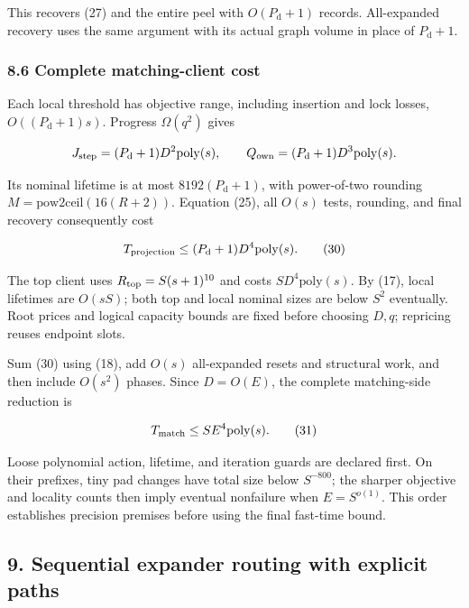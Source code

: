This recovers (27) and the entire peel with \(O(P_{\mathrm d}+1)\) records. All-expanded recovery uses the same argument with its actual graph volume in place of \(P_{\mathrm d}+1\).

\hypertarget{af-46593eb93e-complete-matching-client-cost}{%
\subsubsection{8.6 Complete matching-client cost}\label{af-46593eb93e-complete-matching-client-cost}}

Each local threshold has objective range, including insertion and lock losses, \(O((P_{\mathrm d}+1)s)\). Progress \(\Omega(q^2)\) gives

\[
J_{\rm step}=(P_{\mathrm d}+1)D^2\mathrm{poly}(s),
 \qquad
 Q_{\rm own}=(P_{\mathrm d}+1)D^3\mathrm{poly}(s).
\]

Its nominal lifetime is at most \(8192(P_{\mathrm d}+1)\), with power-of-two rounding \(M=\mathrm{pow2ceil}(16(R+2))\). Equation (25), all \(O(s)\) tests, rounding, and final recovery consequently cost

\[
T_{\rm projection}\leq
       (P_{\mathrm d}+1)D^4\mathrm{poly}(s).
 \tag{30}
\]

The top client uses \(R_{\rm top}=S(s+1)^{10}\) and costs \(SD^4\mathrm{poly}(s)\). By (17), local lifetimes are \(O(sS)\); both top and local nominal sizes are below \(S^2\) eventually. Root prices and logical capacity bounds are fixed before choosing \(D,q\); repricing reuses endpoint slots.

Sum (30) using (18), add \(O(s)\) all-expanded resets and structural work, and then include \(O(s^2)\) phases. Since \(D=O(E)\), the complete matching-side reduction is

\[
T_{\rm match}\leq S E^4\mathrm{poly}(s).
 \tag{31}
\]

Loose polynomial action, lifetime, and iteration guards are declared first. On their prefixes, tiny pad changes have total size below \(S^{-800}\); the sharper objective and locality counts then imply eventual nonfailure when \(E=S^{o(1)}\). This order establishes precision premises before using the final fast-time bound.

\hypertarget{af-46593eb93e-sequential-expander-routing-with-explicit-paths}{%
\subsection{9. Sequential expander routing with explicit paths}\label{af-46593eb93e-sequential-expander-routing-with-explicit-paths}}

